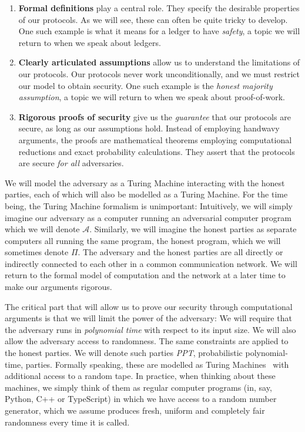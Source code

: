 \begin{enumerate}
  \item \textbf{Formal definitions} play a central role. They specify the
        desirable properties of our protocols. As we will see, these can often
        be quite tricky to develop. One such example is what it means for a
        ledger to have \emph{safety}, a topic we will return to when we speak
        about ledgers.
  \item \textbf{Clearly articulated assumptions} allow us to understand the
        limitations of our protocols. Our protocols never work
        unconditionally, and we must restrict our model to obtain security. One
        such example is the \emph{honest majority assumption}, a topic we will
        return to when we speak about proof-of-work.
  \item \textbf{Rigorous proofs of security} give us the \emph{guarantee} that
        our protocols are secure, as long as our assumptions hold. Instead of
        employing handwavy arguments, the proofs are mathematical theorems
        employing computational reductions and exact probability calculations.
        They assert that the protocols are secure \emph{for all} adversaries.
\end{enumerate}

We will model the adversary as a Turing Machine interacting
with the honest parties, each of which will also be modelled as a Turing Machine. For the
time being, the Turing Machine formalism is unimportant: Intuitively, we will simply imagine
our adversary as a computer running an adversarial computer program which we will denote $\mathcal{A}$.
Similarly, we will imagine the honest parties as separate computers all running the same program,
the honest program, which we will sometimes denote $\Pi$.
The adversary and the honest parties are
all directly or indirectly connected to each other in a common communication network.
We will return to the formal model of computation and the network at a later time to make
our arguments rigorous.

The critical part that will allow us to prove our security through computational arguments
is that we will limit the power of the adversary: We will require that the adversary runs
in \emph{polynomial time} with respect to its input size. We will also allow the adversary
access to randomness. The same constraints are applied to the honest parties. We will
denote such parties \emph{PPT}, probabilistic polynomial-time, parties. Formally speaking,
these are modelled as Turing Machines~\cite{turing} with additional access to a random tape.
In practice, when thinking about these machines, we simply think of them as regular computer
programs (in, say, Python, C++ or TypeScript) in which we have access to a random number
generator, which we assume produces fresh, uniform and completely fair randomness every time
it is called.

